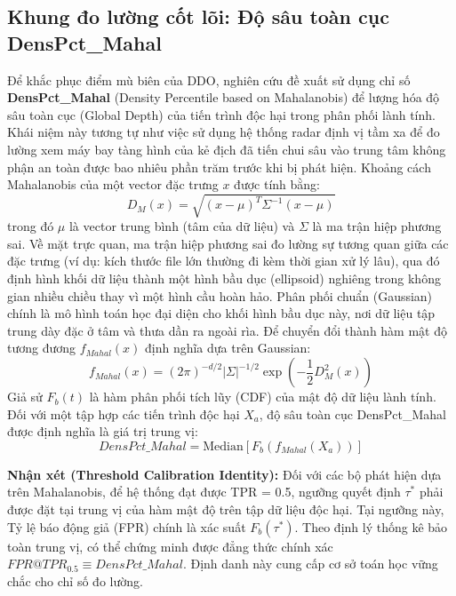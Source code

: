 \documentclass[../main.tex]{subfiles}
\begin{document}
\subsection{Khung đo lường cốt lõi: Độ sâu toàn cục DensPct\_Mahal}
Để khắc phục điểm mù biên của DDO, nghiên cứu đề xuất sử dụng chỉ số \textbf{DensPct\_Mahal} (Density Percentile based on Mahalanobis) để lượng hóa độ sâu toàn cục (Global Depth) của tiến trình độc hại trong phân phối lành tính. Khái niệm này tương tự như việc sử dụng hệ thống radar định vị tầm xa để đo lường xem máy bay tàng hình của kẻ địch đã tiến chui sâu vào trung tâm không phận an toàn được bao nhiêu phần trăm trước khi bị phát hiện.
Khoảng cách Mahalanobis của một vector đặc trưng $x$ được tính bằng:
\begin{equation}
    D_M(x) = \sqrt{(x - \mu)^T \Sigma^{-1} (x - \mu)}
\end{equation}
trong đó $\mu$ là vector trung bình (tâm của dữ liệu) và $\Sigma$ là ma trận hiệp phương sai. Về mặt trực quan, ma trận hiệp phương sai đo lường sự tương quan giữa các đặc trưng (ví dụ: kích thước file lớn thường đi kèm thời gian xử lý lâu), qua đó định hình khối dữ liệu thành một hình bầu dục (ellipsoid) nghiêng trong không gian nhiều chiều thay vì một hình cầu hoàn hảo. Phân phối chuẩn (Gaussian) chính là mô hình toán học đại diện cho khối hình bầu dục này, nơi dữ liệu tập trung dày đặc ở tâm và thưa dần ra ngoài rìa.
Để chuyển đổi thành hàm mật độ tương đương $f_{Mahal}(x)$ định nghĩa dựa trên Gaussian:
\begin{equation}
    f_{Mahal}(x) = (2\pi)^{-d/2} |\Sigma|^{-1/2} \exp\left(-\frac{1}{2} D_M^2(x)\right)
\end{equation}
Giả sử $F_b(t)$ là hàm phân phối tích lũy (CDF) của mật độ dữ liệu lành tính. Đối với một tập hợp các tiến trình độc hại $X_a$, độ sâu toàn cục DensPct\_Mahal được định nghĩa là giá trị trung vị:
\begin{equation}
    DensPct\_Mahal = \text{Median} \left[ F_b(f_{Mahal}(X_a)) \right]
\end{equation}

\textbf{Nhận xét (Threshold Calibration Identity):} Đối với các bộ phát hiện dựa trên Mahalanobis, để hệ thống đạt được TPR = 0.5, ngưỡng quyết định $\tau^*$ phải được đặt tại trung vị của hàm mật độ trên tập dữ liệu độc hại. Tại ngưỡng này, Tỷ lệ báo động giả (FPR) chính là xác suất $F_b(\tau^*)$. Theo định lý thống kê bảo toàn trung vị, có thể chứng minh được đẳng thức chính xác $FPR@TPR_{0.5} \equiv DensPct\_Mahal$. Định danh này cung cấp cơ sở toán học vững chắc cho chỉ số đo lường.
\end{document}
